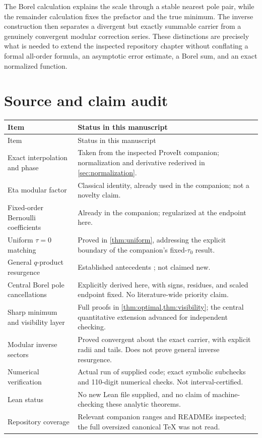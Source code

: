 \documentclass[11pt,a4paper]{article}
\theoremstyle{definition}
\theoremstyle{remark}
\begin{document}
The Borel calculation explains the scale through a stable nearest pole
pair, while the remainder calculation fixes the prefactor and the true
minimum. The inverse construction then separates a divergent but exactly
summable carrier from a genuinely convergent modular correction series.
These distinctions are precisely what is needed to extend the inspected
repository chapter without conflating a formal all-order formula,
an asymptotic error estimate, a Borel sum, and an exact normalized function.

\appendix
\section{Source and claim audit}
\label{app:audit}
\begin{longtable}{@{}p{}p{}@{}}
\toprule
Item & Status in this manuscript\\
\midrule
\endfirsthead
\toprule
Item & Status in this manuscript\\
\midrule
\endhead
Exact interpolation and phase & Taken from the inspected ProveIt companion;
normalization and derivative rederived in \cref{sec:normalization}.\\[5pt]
Eta modular factor & Classical identity, already used in the companion;
not a novelty claim.\\[5pt]
Fixed-order Bernoulli coefficients & Already in the companion;
regularized at the endpoint here.\\[5pt]
Uniform $\tau=0$ matching & Proved in \cref{thm:uniform}, addressing the
explicit boundary of the companion's fixed-$\tau_0$ result.\\[5pt]
General $q$-product resurgence & Established antecedents
\cite{costingaroufalidis,garoufalidiskashaev,fantinirella}; not claimed new.\\[5pt]
Central Borel pole cancellations & Explicitly derived here, with signs,
residues, and scaled endpoint fixed. No literature-wide priority claim.\\[5pt]
Sharp minimum and visibility layer & Full proofs in
\cref{thm:optimal,thm:visibility}; the central quantitative extension
advanced for independent checking.\\[5pt]
Modular inverse sectors & Proved convergent about the exact carrier, with
explicit radii and tails. Does not prove general inverse resurgence.\\[5pt]
Numerical verification & Actual run of supplied code; exact symbolic
subchecks and 110-digit numerical checks. Not interval-certified.\\[5pt]
Lean status & No new Lean file supplied, and no claim of machine-checking
these analytic theorems.\\[5pt]
Repository coverage & Relevant companion ranges and READMEs inspected;
the full oversized canonical TeX was not read.\\
\bottomrule
\end{longtable}
\end{document}
